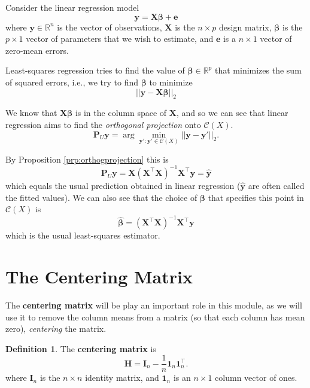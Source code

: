 \documentclass[]{book}
\theoremstyle{definition}
\newtheorem{definition}{Definition}[chapter]
\theoremstyle{definition}
\theoremstyle{definition}
\theoremstyle{remark}
\begin{document}
Consider the linear regression model
\[\mathbf y= \mathbf X\boldsymbol \beta+\mathbf e\]
where \(\mathbf y\in\mathbb{R}^n\) is the vector of observations, \(\mathbf X\) is the \(n\times p\) design matrix, \(\boldsymbol \beta\) is the \(p\times 1\) vector of parameters that we wish to estimate, and \(\mathbf e\) is a \(n\times 1\) vector of zero-mean errors.

Least-squares regression tries to find the value of \(\boldsymbol \beta\in \mathbb{R}^p\) that minimizes the sum of squared errors, i.e., we try to find \(\boldsymbol \beta\) to minimize
\[||\mathbf y- \mathbf X\boldsymbol \beta||_2\]

We know that \(\mathbf X\boldsymbol \beta\) is in the column space of \(\mathbf X\), and so we can see that linear regression aims to find the \emph{orthogonal projection} onto \(\mathcal{C}(X)\).
\[\mathbf P_U\mathbf y=\arg \min_{\mathbf y': \mathbf y' \in \mathcal{C}(X)} ||\mathbf y-\mathbf y'||_2.\]

By Proposition \ref{prp:orthogprojection} this is
\[\mathbf P_U\mathbf y= \mathbf X(\mathbf X^\top \mathbf X)^{-1}\mathbf X^\top \mathbf y=\hat{\mathbf y}\]
which equals the usual prediction obtained in linear regression (\(\hat{\mathbf y}\) are often called the fitted values). We can also see that the choice of \(\boldsymbol \beta\) that specifies this point in \(\mathcal{C}(X)\) is
\[\hat{\boldsymbol \beta}=(\mathbf X^\top \mathbf X)^{-1}\mathbf X^\top \mathbf y\]
which is the usual least-squares estimator.

\hypertarget{centering-matrix}{%
\section{The Centering Matrix}\label{centering-matrix}}

The \textbf{centering matrix} will be play an important role in this module, as we will use it to remove the column means from a matrix (so that each column has mean zero), \emph{centering} the matrix.

\begin{definition}
\protect\hypertarget{def:centeringmatrix}{}{\label{def:centeringmatrix} } The \textbf{centering matrix} is
\begin{equation}
\mathbf H=\mathbf I_n - \frac{1}{n} {\mathbf 1}_n {\mathbf 1}_n^\top.
\label{eq:Hcentre}
\end{equation}
where \(\mathbf I_n\) is the \(n \times n\) identity matrix, and \({\mathbf 1}_n\) is an \(n \times 1\) column vector of ones.
\end{definition}
\end{document}
